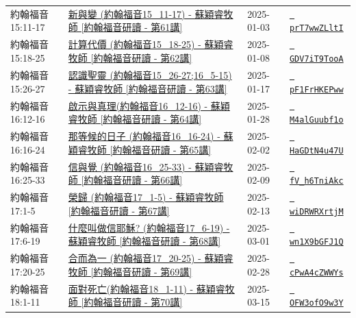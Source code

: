 \documentclass{book}
\begin{document}
{ \scriptsize


\begin{xltabular}{\textwidth}{|p{0.15\textwidth} p{0.6\textwidth}|p{0.07\textwidth} p{0.1\textwidth}|}
\hline
約翰福音 15:11-17 & \hyperref[sec:prT7wwZLltI]{新與變 (約翰福音15\_11-17) - 蘇穎睿牧師 [約翰福音研讀 - 第61講]} & 2025-01-03 & \href{https://youtube.com/watch?v=prT7wwZLltI}{\texttt{ prT7wwZLltI}} \\
約翰福音 15:18-25 & \hyperref[sec:GDV7iT9TooA]{計算代價 (約翰福音15\_18-25) - 蘇穎睿牧師 [約翰福音研讀 - 第62講]} & 2025-01-08 & \href{https://youtube.com/watch?v=GDV7iT9TooA}{\texttt{ GDV7iT9TooA}} \\
約翰福音 15:26-27 & \hyperref[sec:pF1FrHKEPww]{認識聖靈 (約翰福音15\_26-27;16\_5-15) - 蘇穎睿牧師 [約翰福音研讀 - 第63講]} & 2025-01-17 & \href{https://youtube.com/watch?v=pF1FrHKEPww}{\texttt{ pF1FrHKEPww}} \\
約翰福音 16:12-16 & \hyperref[sec:M4alGuubf1o]{啟示與真理(約翰福音16\_12-16) - 蘇穎睿牧師 [約翰福音研讀 - 第64講]} & 2025-01-28 & \href{https://youtube.com/watch?v=M4alGuubf1o}{\texttt{ M4alGuubf1o}} \\
約翰福音 16:16-24 & \hyperref[sec:HaGDtN4u47U]{那等候的日子 (約翰福音16\_16-24) - 蘇穎睿牧師 [約翰福音研讀 - 第65講]} & 2025-02-02 & \href{https://youtube.com/watch?v=HaGDtN4u47U}{\texttt{ HaGDtN4u47U}} \\
約翰福音 16:25-33 & \hyperref[sec:fV_h6TniAkc]{信與覺 (約翰福音16\_25-33) - 蘇穎睿牧師 [約翰福音研讀 - 第66講]} & 2025-02-09 & \href{https://youtube.com/watch?v=fV_h6TniAkc}{\texttt{ fV\_h6TniAkc}} \\
約翰福音 17:1-5 & \hyperref[sec:wiDRWRXrtjM]{榮歸 (約翰福音17\_1-5) - 蘇穎睿牧師 [約翰福音研讀 - 第67講]} & 2025-02-13 & \href{https://youtube.com/watch?v=wiDRWRXrtjM}{\texttt{ wiDRWRXrtjM}} \\
約翰福音 17:6-19 & \hyperref[sec:wn1X9bGFJ1Q]{什麼叫做信耶穌? (約翰福音17\_6-19) - 蘇穎睿牧師 [約翰福音研讀 - 第68講]} & 2025-03-01 & \href{https://youtube.com/watch?v=wn1X9bGFJ1Q}{\texttt{ wn1X9bGFJ1Q}} \\
約翰福音 17:20-25 & \hyperref[sec:cPwA4cZWWYs]{合而為一 (約翰福音17\_20-25) - 蘇穎睿牧師 [約翰福音研讀 - 第69講]} & 2025-02-28 & \href{https://youtube.com/watch?v=cPwA4cZWWYs}{\texttt{ cPwA4cZWWYs}} \\
約翰福音 18:1-11 & \hyperref[sec:OFW3ofO9w3Y]{面對死亡(約翰福音18\_1-11) - 蘇穎睿牧師 [約翰福音研讀 - 第70講]} & 2025-03-15 & \href{https://youtube.com/watch?v=OFW3ofO9w3Y}{\texttt{ OFW3ofO9w3Y}} \\
\hline
\end{xltabular}
}
\newpage
\end{document}
